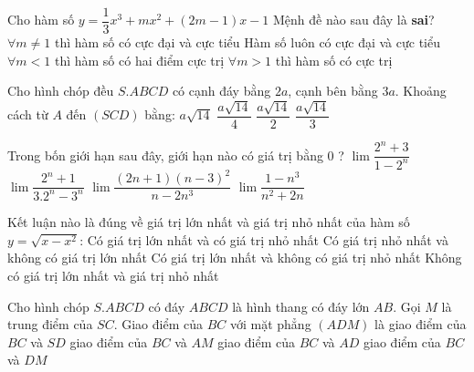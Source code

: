 \begin{ex}%
	Cho hàm số $ y = \dfrac{1}{3}{x^3}+ m{x^2}+ ({2m - 1})x - 1$ Mệnh đề nào sau đây là \textbf{sai}?
	\choice
	{$ \forall m \ne 1 $ thì hàm số có cực đại và cực tiểu}
	{\True Hàm số luôn có cực đại và cực tiểu}
	{$ \forall m < 1 $ thì hàm số có hai điểm cực trị}
	{$ \forall m > 1 $ thì hàm số có cực trị}
\end{ex}
\begin{ex}%
	Cho hình chóp đều $S.ABCD$ có cạnh đáy bằng $2a$, cạnh bên bằng $3a$. Khoảng cách từ $A$ đến $(SCD)$ bằng:
	\choice
	{$ a\sqrt{14}$}
	{$ \dfrac{{a\sqrt{14}}}{4}$}
	{\True $ \dfrac{{a\sqrt{14}}}{2}$}
	{$ \dfrac{{a\sqrt{14}}}{3}$}
\end{ex}
\begin{ex}%
	Trong bốn giới hạn sau đây, giới hạn nào có giá trị bằng 0 ?
	\choice
	{$ \lim \dfrac{2^n+ 3}{1 -2^n}$}
	{\True $ \lim \dfrac{2^n+ 1}{3.2^n-3^n}$}
	{$ \lim \dfrac{(2n + 1)(n - 3)^2}{n - 2n^3}$}
	{$ \lim \dfrac{1 -n^3}{n^2+2n}$}
\end{ex}
\begin{ex}%
	Kết luận nào là đúng về giá trị lớn nhất và giá trị nhỏ nhất của hàm số $y=\sqrt{x-x^2}$:
	\choice
	{\True Có giá trị lớn nhất và có giá trị nhỏ nhất}
	{Có giá trị nhỏ nhất và không có giá trị lớn nhất}
	{\True Có giá trị lớn nhất và không có giá trị nhỏ nhất}
	{Không có giá trị lớn nhất và giá trị nhỏ nhất}
\end{ex}
\begin{ex}%
	Cho hình chóp $S.ABCD$ có đáy $ABCD$ là hình thang có đáy lớn $AB$. Gọi $M$ là trung điểm của $SC$. Giao điểm của $BC$ với mặt phẳng $(ADM)$ là
	\choice
	{giao điểm của $BC$ và $SD$}
	{giao điểm của $BC$ và $AM$}
	{giao điểm của $BC$ và $AD$}
	{\True giao điểm của $BC$ và $DM$}
\end{ex}


